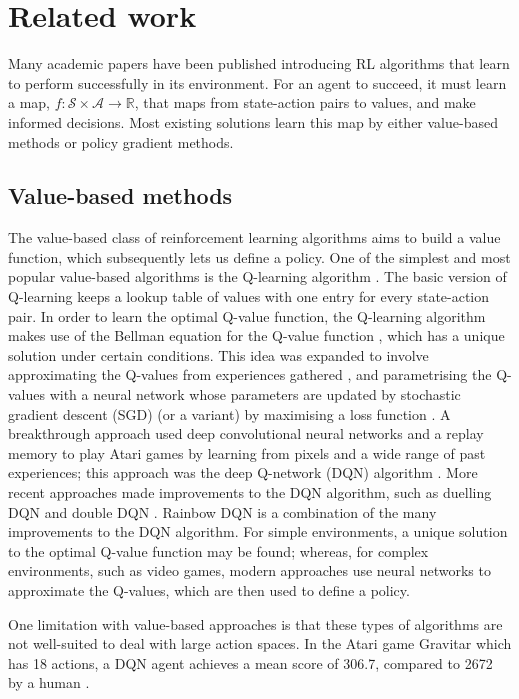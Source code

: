 \documentclass[12pt,a4paper]{article}
\begin{document}
\newpage
\section{Related work}
\label{section:related-work}
Many academic papers have been published introducing RL algorithms that learn to perform successfully in its environment. For an agent to succeed, it must learn a map, $f: \mathcal{S} \times \mathcal{A} \rightarrow \mathbb{R}$, that maps from state-action pairs to values, and make informed decisions. Most existing solutions learn this map by either value-based methods or policy gradient methods. 

\subsection{Value-based methods}
The value-based class of reinforcement learning algorithms aims to build a value function, which subsequently lets us define a policy. One of the simplest and most popular value-based algorithms is the Q-learning algorithm \cite{Watkins1992}. The basic version of Q-learning keeps a lookup table of values with one entry for every state-action pair. In order to learn the optimal Q-value function, the Q-learning algorithm makes use of the Bellman equation for the Q-value function \cite{R-352-PR}, which has a unique solution under certain conditions. This idea was expanded to involve approximating the Q-values from experiences gathered \cite{10.5555/2998828.2998976}, and parametrising the Q-values with a neural network whose parameters are updated by stochastic gradient descent (SGD) (or a variant) by maximising a loss function \cite{10.1007/11564096_32}. A breakthrough approach used deep convolutional neural networks and a replay memory to play Atari games by learning from pixels and a wide range of past experiences; this approach was the deep Q-network (DQN) algorithm \cite{DBLP:journals/corr/MnihKSGAWR13}. More recent approaches made improvements to the DQN algorithm, such as duelling DQN \cite{DBLP:journals/corr/WangFL15} and double DQN \cite{DBLP:journals/corr/HasseltGS15}. Rainbow DQN \cite{DBLP:journals/corr/abs-1710-02298} is a combination of the many improvements to the DQN algorithm. For simple environments, a unique solution to the optimal Q-value function may be found; whereas, for complex environments, such as video games, modern approaches use neural networks to approximate the Q-values, which are then used to define a policy. 

One limitation with value-based approaches is that these types of algorithms are not well-suited to deal with large action spaces. In the Atari game Gravitar which has 18 actions, a DQN agent achieves a mean score of 306.7, compared to 2672 by a human \cite{Mnih2015}. 
\end{document}
